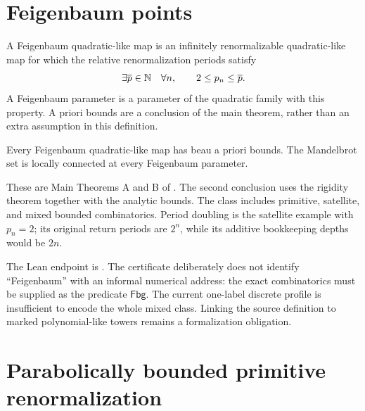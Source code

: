 \section{Feigenbaum points}

\begin{definition}
\label{def:feigenbaum-class}
A Feigenbaum quadratic-like map is an infinitely renormalizable
quadratic-like map for which the relative renormalization periods
satisfy
\[
 \exists\overline p\in\mathbb N\quad\forall n,\qquad 2\le p_n\le\overline p.
\]
A Feigenbaum parameter is a parameter of the quadratic family with
this property.  A priori bounds are a conclusion of the main theorem,
rather than an extra assumption in this definition.
\end{definition}

\begin{theorem}
\label{thm:dudko-lyubich-feigenbaum}
Every Feigenbaum quadratic-like map has beau a priori bounds.
The Mandelbrot set is locally connected at every Feigenbaum parameter.
\end{theorem}

These are Main Theorems A and B of
\cite{DudkoLyubichFeigenbaum}.  The second conclusion uses the
rigidity theorem together with the analytic bounds.  The class
includes primitive, satellite, and mixed bounded combinatorics.
Period doubling is the satellite example with $p_n=2$; its original
return periods are $2^n$, while its additive bookkeeping depths
would be $2n$.

The Lean endpoint is
.  The certificate deliberately does not
identify ``Feigenbaum'' with an informal numerical address: the exact
combinatorics must be supplied as the predicate $\mathsf{Fbg}$.
The current one-label discrete profile is insufficient to encode the
whole mixed class.  Linking the source definition to marked
polynomial-like towers remains a formalization obligation.


\section{Parabolically bounded primitive renormalization}


